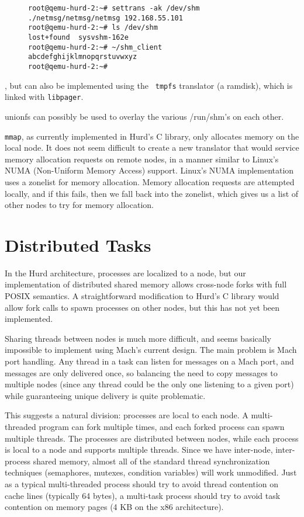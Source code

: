 \documentclass{article}
\def\libpager{{\tt libpager}\xspace}
\begin{document}
\begin{figure}[h]
\begin{mdframed}
\begin{verbatim}
root@qemu-hurd-2:~# settrans -ak /dev/shm ./netmsg/netmsg/netmsg 192.168.55.101
root@qemu-hurd-2:~# ls /dev/shm
lost+found  sysvshm-162e
root@qemu-hurd-2:~# ~/shm_client 
abcdefghijklmnopqrstuvwxyz
root@qemu-hurd-2:~# 
\end{verbatim}
\end{mdframed}
\end{figure}

, but can also be implemented using the {\tt
  tmpfs} translator (a ramdisk), which is linked with \libpager.

unionfs can possibly be used to
overlay the various /run/shm's on each other.

{\tt mmap}, as currently implemented in Hurd's C library, only
allocates memory on the local node.  It does not seem difficult to
create a new translator that would service memory allocation requests
on remote nodes, in a manner similar to Linux's NUMA (Non-Uniform
Memory Access) support.  Linux's NUMA implementation uses a zonelist
for memory allocation.  Memory allocation requests are attempted
locally, and if this fails, then we fall back into the zonelist, which
gives us a list of other nodes to try for memory allocation.


\section{Distributed Tasks}

In the Hurd architecture, processes are localized to a node, but our
implementation of distributed shared memory allows cross-node forks
with full POSIX semantics.  A straightforward modification to Hurd's C
library would allow fork calls to spawn processes on other nodes, but
this has not yet been implemented.

Sharing threads between nodes is much more difficult, and seems
basically impossible to implement using Mach's current design.  The
main problem is Mach port handling.  Any thread in a task can listen
for messages on a Mach port, and messages are only delivered once, so
balancing the need to copy messages to multiple nodes (since any
thread could be the only one listening to a given port) while
guaranteeing unique delivery is quite problematic.

This suggests a natural division: processes are local to each node.  A
multi-threaded program can fork multiple times, and each forked
process can spawn multiple threads.  The processes are distributed
between nodes, while each process is local to a node and supports
multiple threads.  Since we have inter-node, inter-process shared
memory, almost all of the standard thread synchronization techniques
(semaphores, mutexes, condition variables) will work unmodified.  Just
as a typical multi-threaded process should try to avoid thread
contention on cache lines (typically 64 bytes), a multi-task process
should try to avoid task contention on memory pages (4 KB on the x86
architecture).
\end{document}
